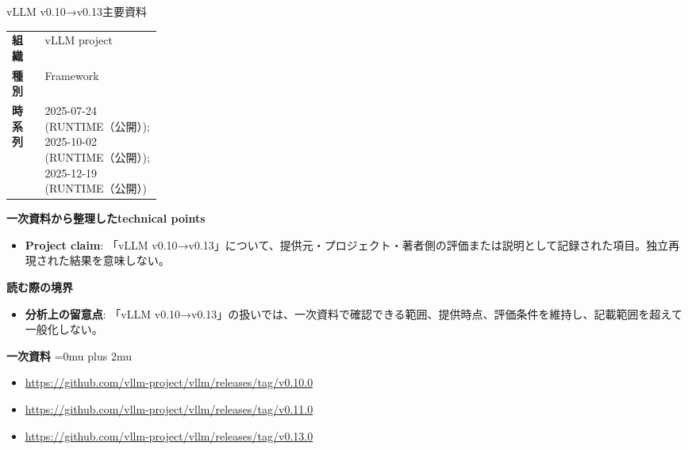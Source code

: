 \begin{technicalnote}{vLLM v0.10→v0.13}{主要資料}
\begingroup
\begin{tabularx}{\linewidth}{@{}>{\bfseries}p{0.22\linewidth}X@{}}
組織 & vLLM project \\
種別 & Framework \\
時系列 & 2025-07-24 (RUNTIME（公開）); 2025-10-02 (RUNTIME（公開）); 2025-12-19 (RUNTIME（公開）) \\
\end{tabularx}
\smallskip
{\bfseries 一次資料から整理したtechnical points}
\begin{itemize}[leftmargin=1.5em,itemsep=0.35em]
\item \textbf{Project claim}: 「vLLM v0.10→v0.13」について、提供元・プロジェクト・著者側の評価または説明として記録された項目。独立再現された結果を意味しない。
\end{itemize}
\begin{minipage}{\linewidth}
{\bfseries 読む際の境界}
\begin{itemize}[leftmargin=1.5em,itemsep=0.35em]
\item \textbf{分析上の留意点}: 「vLLM v0.10→v0.13」の扱いでは、一次資料で確認できる範囲、提供時点、評価条件を維持し、記載範囲を超えて一般化しない。
\end{itemize}
\begin{samepage}
{\bfseries 一次資料}
\begingroup\sloppy
\Urlmuskip=0mu plus 2mu\relax
\begin{itemize}[leftmargin=1.5em,itemsep=0.25em]
\item {\scriptsize\url{https://github.com/vllm-project/vllm/releases/tag/v0.10.0}}
\item {\scriptsize\url{https://github.com/vllm-project/vllm/releases/tag/v0.11.0}}
\item {\scriptsize\url{https://github.com/vllm-project/vllm/releases/tag/v0.13.0}}
\end{itemize}
\endgroup
\end{samepage}
\end{minipage}
\endgroup
\end{technicalnote}
\medskip


